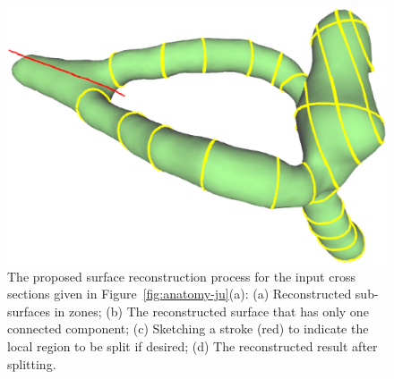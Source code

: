 \begin{figure} [htbp]
{\begin{minipage}[b]{0.23\textwidth}
      \includegraphics[scale=0.14]{figs/f6.anatomy-split.eps}%
    \end{minipage}}
  \caption{The proposed surface reconstruction process for the input cross sections given in Figure~\ref{fig:anatomy-ju}(a):
  (a) Reconstructed sub-surfaces in zones;
  (b) The reconstructed surface that has only one connected component;
  (c) Sketching a stroke (red) to indicate the local region to be split if desired;
  (d) The reconstructed result after splitting. }
  \label{fig:anatomy}
\end{figure}

